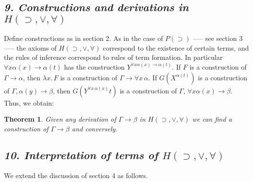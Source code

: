 \documentclass[12pt]{article}
\def\imp{\rightarrow}
\def\l{\lambda}
\def\limp{\supset}
\def\PI{P(\limp)}
\def\G{\Gamma}
\def\a{\alpha}
\def\b{\beta}
\def\gimpb{\G \imp \b}
\def\gimpa{\G \imp \a}
\def\HIMP{H(\limp, \lor, \forall)}
\newtheorem{theorem}{Theorem}
\begin{document}
\subsection{\it 9. Constructions and derivations in $\HIMP$}

Define constructions as in section 2. As in the case of $\PI$ —-- see section 3 —-- the axioms of $\HIMP$ correspond to the existence of
certain terms, and the rules of inference correspond to rules of term formation. In particular $\forall x \a(x) \imp \a(t)$ has the
construction $Y^{\forall x  \a(x) \imp \a(t)}$. If $F$ is a construction of $\gimpa$, then $\l x. \, F$ is a construction of $\G \imp \forall x \, \a$. If $G(X^{\a(t)})$ is a construction of $\G,\a(y) \imp \b$, then $G(Y^{\forall x \, \a (x)} t)$ is a construction of 
$\G, \, \forall x \a (x) \imp \b$. Thus, we obtain:

\begin{theorem}
Given any derivation of $\gimpb$ in $\HIMP$ we can find a construction of $\gimpb$ and conversely.
\end{theorem}

\subsection{\it 10. Interpretation of terms of $\HIMP$}

We extend the discussion of section 4 as follows.
\end{document}
